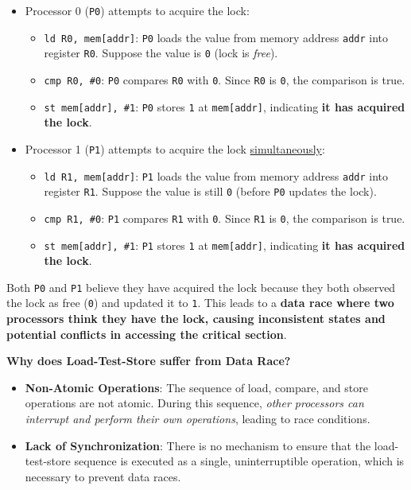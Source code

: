 \begin{itemize}
    \item Processor 0 (\texttt{P0}) attempts to acquire the lock:
    \begin{itemize}
      \item \texttt{ld R0, mem[addr]}: \texttt{P0} loads the value from memory address \texttt{addr} into register \texttt{R0}. Suppose the value is \texttt{0} (lock is \emph{free}).
    
      \item \texttt{cmp R0, \#0}: \texttt{P0} compares \texttt{R0} with \texttt{0}. Since \texttt{R0} is \texttt{0}, the comparison is true.
      
      \item \texttt{st mem[addr], \#1}: \texttt{P0} stores \texttt{1} at \texttt{mem[addr]}, indicating \textbf{it has acquired the lock}.
    \end{itemize}  
    
    \item Processor 1 (\texttt{P1}) attempts to acquire the lock \underline{simultaneously}:
    \begin{itemize}
      \item \texttt{ld R1, mem[addr]}: \texttt{P1} loads the value from memory address \texttt{addr} into register \texttt{R1}. Suppose the value is still \texttt{0} (before \texttt{P0} updates the lock).
      
      \item \texttt{cmp R1, \#0}: \texttt{P1} compares \texttt{R1} with \texttt{0}. Since \texttt{R1} is \texttt{0}, the comparison is true.
      
      \item \texttt{st mem[addr], \#1}: \texttt{P1} stores \texttt{1} at \texttt{mem[addr]}, indicating \textbf{it has acquired the lock}.
    \end{itemize}
\end{itemize}
Both \texttt{P0} and \texttt{P1} believe they have acquired the lock because they both observed the lock as free (\texttt{0}) and updated it to \texttt{1}. This leads to a \textbf{data race where two processors think they have the lock, causing inconsistent states and potential conflicts in accessing the critical section}.

\highspace
\begin{flushleft}
    \textcolor{Red2}{ \textbf{Why does Load-Test-Store suffer from Data Race?}}
\end{flushleft}
\begin{itemize}
    \item \textbf{Non-Atomic Operations}: The sequence of load, compare, and store operations are not atomic. During this sequence, \emph{other processors can interrupt and perform their own operations}, leading to race conditions.

    \item \textbf{Lack of Synchronization}: There is no mechanism to ensure that the load-test-store sequence is executed as a single, uninterruptible operation, which is necessary to prevent data races.
\end{itemize}


